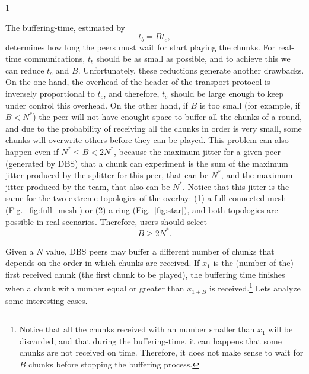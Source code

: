 1%


\label{sec:buffering_time}
The buffering-time, estimated by
\begin{equation}
  \label{eq:t_b}
  t_b = Bt_c,  %
\end{equation}
determines how long the peers must wait for start playing the
chunks. For real-time communications, $t_b$ should be as small as
possible, and to achieve this we can reduce $t_c$ and
$B$. Unfortunately, these reductions generate another drawbacks. On
the one hand, the overhead of the header of the transport protocol is
inversely proportional to $t_c$, and therefore, $t_c$ should be large
enough to keep under control this overhead. On the other hand, if $B$
is too small (for example, if $B<N^*$) the peer will not have enought
space to buffer all the chunks of a round, and due to the probability
of receiving all the chunks in order is very small, some chunks will
overwrite others before they can be played. This problem can also
happen even if $N^*\leq B<2N^*$, because the maximum jitter for a
given peer (generated by DBS) that a chunk can experiment is the sum
of the maximum jitter produced by the splitter for this peer, that can
be $N^*$, and the maximum jitter produced by the team, that also can
be $N^*$. Notice that this jitter is the same for the two extreme
topologies of the overlay: (1) a full-connected mesh
(Fig.~\ref{fig:full_mesh}) or (2) a ring (Fig.~\ref{fig:star}), and
both topologies are possible in real scenarios. Therefore, users
should select
\begin{equation}
  \label{eq:minimum_B}
  B\ge 2N^*.
\end{equation}

Given a $N$ value, DBS peers may buffer a different number of chunks
that depends on the order in which chunks are received. If $x_1$ is
the (number of the) first received chunk (the first chunk to be
played), the buffering time finishes when a chunk with number equal or
greater than $x_{1+B}$ is received.\footnote{Notice that all the
  chunks received with an number smaller than $x_1$ will be discarded,
  and that during the buffering-time, it can happens that some chunks
  are not received on time. Therefore, it does not make sense to wait
  for $B$ chunks before stopping the buffering process.} Lets analyze
some interesting cases.


